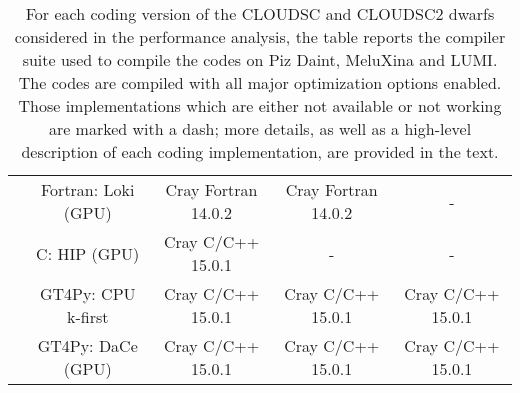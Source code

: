 \documentclass[main.tex]{subfiles}
\begin{document}
\begin{table}[t!]
\begin{footnotesize}
\begin{tabular}{|c|c|c|c|c|}
                     & Fortran: Loki (GPU) & Cray Fortran 14.0.2 & Cray Fortran 14.0.2 & - \\
                     & C: HIP (GPU) & Cray C/C++ 15.0.1 & - & - \\
                     & GT4Py: CPU k-first & Cray C/C++ 15.0.1 & Cray C/C++ 15.0.1 & Cray C/C++ 15.0.1 \\
                     & GT4Py: DaCe (GPU) & Cray C/C++ 15.0.1 & Cray C/C++ 15.0.1 & Cray C/C++ 15.0.1 \\
                     \hline
                \end{tabular}
            \end{footnotesize}
            \vspace*{0.2cm}
            \caption{For each coding version of the CLOUDSC and CLOUDSC2 dwarfs considered in the performance analysis, the table reports the compiler suite used to compile the codes on Piz Daint, MeluXina and LUMI. The codes are compiled with all major optimization options enabled. Those implementations which are either not available or not working are marked with a dash; more details, as well as a high-level description of each coding implementation, are provided in the text.}
            \label{tab:compiler}
        \end{table}
        
\end{document}
